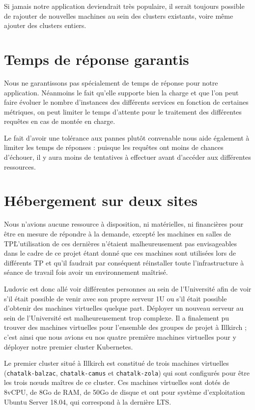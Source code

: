 Si jamais notre application deviendrait très populaire, il serait
toujours possible de rajouter de nouvelles machines au sein des clusters
existants, voire même ajouter des clusters entiers.

\section{Temps de réponse garantis}

Nous ne garantissons pas spécialement de temps de réponse pour notre
application. Néanmoins le fait qu'elle supporte bien la charge et que
l'on peut faire évoluer le nombre d'instances des différents services en
fonction de certaines métriques, on peut limiter le temps d'attente pour
le traitement des différentes requêtes en cas de montée en charge.

Le fait d'avoir une tolérance aux pannes plutôt convenable nous aide
également à limiter les temps de réponses : puisque les requêtes ont
moins de chances d'échouer, il y aura moins de tentatives à effectuer
avant d'accéder aux différentes ressources.

\section{Hébergement sur deux sites}

Nous n'avions aucune ressource à disposition, ni matérielles, ni
financières pour être en mesure de répondre à la demande, excepté les
machines en salles de TP\.
L'utilisation de ces dernières n'étaient malheureusement pas envisageables
dans le cadre de ce projet étant donné que ces machines sont utilisées lors
de différents TP et qu'il faudrait par conséquent réinstaller toute
l'infrastructure à séance de travail fois avoir un environnement maîtrisé.

Ludovic est donc allé voir différentes personnes au sein de l'Université
afin de voir s'il était possible de venir avec son propre serveur 1U ou
s'il était possible d'obtenir des machines virtuelles quelque part.
Déployer un nouveau serveur au sein de l'Université est malheureusement
trop complexe. Il a finalement pu trouver des machines virtuelles pour
l'ensemble des groupes de projet à Illkirch ; c'est ainsi que nous
avions eu nos quatre première machines virtuelles pour y déployer notre
premier cluster Kubernetes.

Le premier cluster situé à Illkirch est constitué de trois machines
virtuelles (\texttt{chatalk-balzac}, \texttt{chatalk-camus} et
\texttt{chatalk-zola}) qui sont configurés pour être les trois nœuds
maîtres de ce cluster. Ces machines virtuelles sont dotés de 8vCPU,
de 8Go de RAM, de 50Go de disque et ont pour système d'exploitation
Ubuntu Server 18.04, qui correspond à la dernière LTS.

